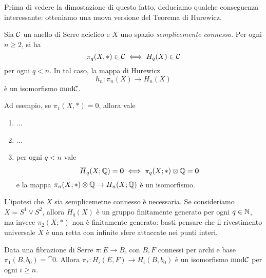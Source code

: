 


Prima di vedere la dimostazione di questo fatto,
deduciamo qualche conseguenza interessante:
otteniamo una nuova versione del Teorema di Hurewicz.

\begin{cor}
	Sia $\mathcal{C}$ un anello di Serre aciclico e $X$ uno spazio \emph{semplicemente connesso}.
	Per ogni $n \ge 2$, si ha
	\begin{equation*}
		\pi_{q}(X, \ast) \in \mathcal{C} \iff H_{q}(X) \in \mathcal{C}
	\end{equation*}
	per ogni $q < n$. In tal caso, la mappa di Hurewicz
	\begin{equation*}
		h_{n} : \pi_{n}(X) \longrightarrow H_{n}(X)
	\end{equation*}
	è un isomorfismo $\mathrm{mod} \mathcal{C}$.
\end{cor}

Ad esempio, se $\pi_{1}(X,\ast)=0$, allora vale
\begin{enumerate}
	\item ...
	\item ...
	\item per ogni $q < n$ vale
	\begin{equation*}
		\overline{H}_{q}(X;{\mathbb Q}) = {\normalfont\textbf{0}} \iff \pi_{q}(X;\ast) \otimes {\mathbb Q} = {\normalfont\textbf{0}}
	\end{equation*}
	e la mappa $\pi_{n}(X;\ast) \otimes {\mathbb Q} \to H_{n}(X;{\mathbb Q})$ è un isomorfismo.
\end{enumerate}

\begin{ex}
	L'ipotesi che $X$ sia semplicemetne connesso è necessaria.
	Se consideriamo $X = S^{1} \vee S^{2}$, allora $H_{q}(X)$ è un
	gruppo finitamente generato per ogni $q \in {\mathbb N}$, ma invece
	$\pi_{2}(X;\ast)$ non è finitamente generato:
	basti pensare che il rivestimento universale $\widetilde{X}$
	è una retta con infinite sfere attaccate nei punti interi.
\end{ex}

\begin{prop}\label{magia}
	Data una fibrazione di Serre $\pi : E \to B$, 
	con $B,F$ connessi per archi e base $\pi_{1}(B,b_{0})=\cat{0}$.
	Allora $\pi_{*}:H_{i}(E,F) \to H_{i}(B,b_{0})$ è un isomorfismo
	$\mathrm{mod}\mathcal{C}$ per ogni $i \ge n$.
\end{prop}

